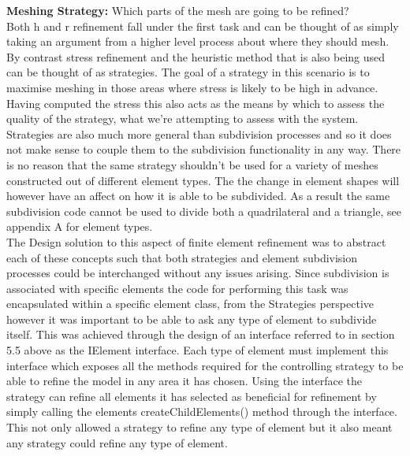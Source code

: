 \noindent
\textbf{Meshing Strategy: } Which parts of the mesh are going to be refined? \\ 

\noindent
Both h and r refinement fall under the first task and can be thought of as simply taking an argument from a higher level process about where they should mesh. \\

\noindent
By contrast stress refinement and the heuristic method that is also being used can be thought of as strategies. The goal of a strategy in this scenario is to maximise meshing in those areas where stress is likely to be high in advance. Having computed the stress this also acts as the means by which to assess the quality of the strategy, what we're attempting to assess with the system. Strategies are also much more general than subdivision processes and so it does not make sense to couple them to the subdivision functionality in any way. There is no reason that the same strategy shouldn't be used for a variety of meshes constructed out of different element types. The the change in element shapes will however have an affect on how it is able to be subdivided. As a result the same subdivision code cannot be used to divide both a quadrilateral and a triangle, see appendix A for element types. \\ 


\noindent
The Design solution to this aspect of finite element refinement was to abstract each of these concepts such that both strategies and element subdivision processes could be interchanged without any issues arising. Since subdivision is associated with specific elements the code for performing this task was encapsulated within a specific element class, from the Strategies perspective however it was important to be able to ask any type of element to subdivide itself. This was achieved through the design of an interface referred to in section 5.5 above as the IElement interface. Each type of element must implement this interface which exposes all the methods required for the controlling strategy to be able to refine the model in any area it has chosen. Using the interface the strategy can refine all elements it has selected as beneficial for refinement by simply calling the elements createChildElements() method through the interface. This not only allowed a strategy to refine any type of element but it also meant any strategy could refine any type of element. \\ 


